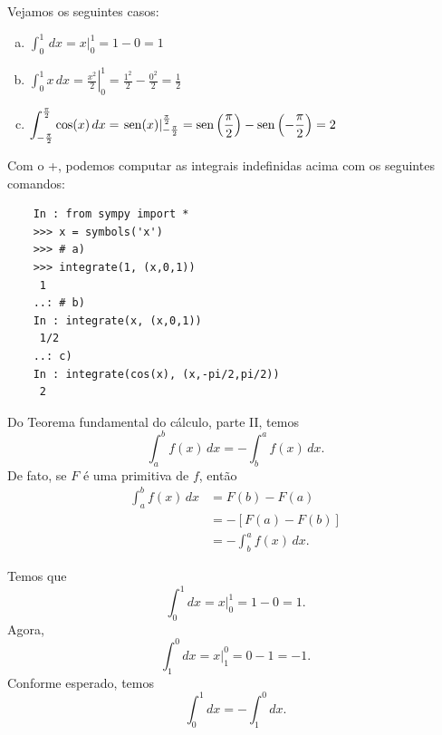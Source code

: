 \begin{ex}
  Vejamos os seguintes casos:
  \begin{enumerate}[a)]
  \item $\displaystyle \int_0^1 \,dx = \left. x \right|_0^1 = 1 - 0 = 1$
  \item $\displaystyle \int_0^1 x\,dx = \left.\frac{x^2}{2}\right|_0^1 = \frac{1^2}{2}-\frac{0^2}{2} = \frac{1}{2}$
  \item $\displaystyle \int_{-\frac{\pi}{2}}^{\frac{\pi}{2}} \cos(x)\,dx = \left.\operatorname{sen}(x)\right|_{-\frac{\pi}{2}}^{\frac{\pi}{2}} = \operatorname{sen}\left(\frac{\pi}{2}\right) - \operatorname{sen}\left(-\frac{\pi}{2}\right) = 2$
  \end{enumerate}
  \ifispython
  Com o {\python}+{\sympy}, podemos computar as integrais indefinidas acima com os seguintes comandos:
  \begin{lstlisting}
    In : from sympy import *
    >>> x = symbols('x')
    >>> # a)
    >>> integrate(1, (x,0,1))
     1
    ..: # b)
    In : integrate(x, (x,0,1))
     1/2
    ..: c)
    In : integrate(cos(x), (x,-pi/2,pi/2))
     2
  \end{lstlisting}
  \fi  
\end{ex}

\begin{obs}
  Do Teorema fundamental do cálculo, parte II, temos
  \begin{equation}
    \int_a^b f(x)\,dx = - \int_b^a f(x)\,dx.
  \end{equation}
  De fato, se $F$ é uma primitiva de $f$, então
  \begin{align}
    \int_a^b f(x)\,dx &= F(b) - F(a) \\
                      &= - \left[F(a) - F(b)\right] \\
                      &= - \int_b^a f(x)\,dx.
  \end{align}
\end{obs}

\begin{ex}
  Temos que
  \begin{equation}
    \int_0^1 dx = \left. x\right|_0^1 = 1 - 0 = 1.
  \end{equation}
  Agora,
  \begin{equation}
    \int_1^0 dx = \left. x\right|_1^0 = 0 - 1 = -1.
  \end{equation}
  Conforme esperado, temos
  \begin{equation}
    \int_0^1 dx = - \int_1^0 dx.
  \end{equation}
\end{ex}

